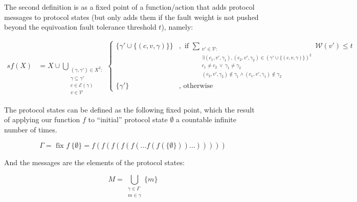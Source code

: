 The second definition is as a fixed point of a function/action that adds protocol messages to protocol states (but only adds them if the fault weight is not pushed beyond the equivoation fault tolerance threshold $t$), namely:

\begin{align}s
f(X) &= X \cup \bigcup_{\substack{(\gamma, \gamma') \in X^2 : \\ \gamma \subseteq \gamma' \\ c \in \mathcal{E}(\gamma) \\ v \in \mathcal{V}}}
\begin{cases}
      \{\gamma' \cup \{(c, v, \gamma)\} \} &, \text{ if } \sum_{ \substack{v' \in \mathcal{V} : \\ \exists (c_1 , v', \gamma_1), (c_2 , v', \gamma_2) \in (\gamma' \cup \{(c, v, \gamma)\})^2 \\ c_1 \neq c_2 ~ \lor ~ \gamma_1 \neq \gamma_2 \\  (c_2 , v', \gamma_2) \notin \gamma_1  \land (c_1 , v', \gamma_1) \notin \gamma_2}} \mathcal{W}(v') \leq t \\
      \{\gamma'\} &, \text{ otherwise }
\end{cases}
\end{align}

The protocol states can be defined as the following fixed point, which the result of applying our function $f$ to ``initial'' protocol state $\emptyset$ a countable infinite number of times.

\[
\Gamma = \text{ fix } f ~ \{\emptyset\} = f(f(f(f(f(\dots f(f(\{\emptyset\}))\dots)))))
\]

And the messages are the elements of the protocol states:

\[
M = \bigcup_{\substack{\gamma \in \Gamma \\ m \in \gamma}} \{m\}
\]
